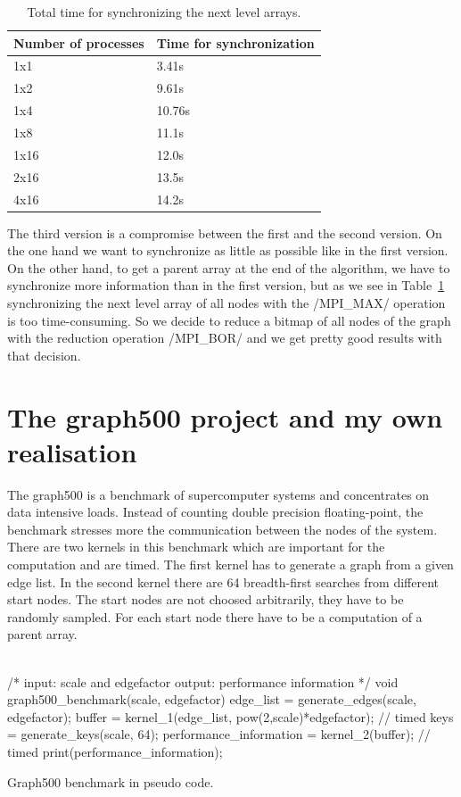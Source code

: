 \documentclass[12pt,a4paper]{article}
\begin{document}
\begin{table}[!ht]
	\centering
	\begin{tabular}{ | l | l |}
  		\hline
  		Number of processes & Time for synchronization \\ \hline
  		1x1 & 3.41s \\ \hline
		1x2 & 9.61s \\ \hline
		1x4 & 10.76s \\ \hline
		1x8 & 11.1s \\ \hline
		1x16 & 12.0s \\ \hline
		2x16 & 13.5s \\ \hline
		4x16 & 14.2s \\ \hline
	\end{tabular}
	\caption{Total time for synchronizing the next level arrays.}
  	\label{tab:reducescatter}
\end{table}
The third version is a compromise between the first and the second version. On the one hand we want to synchronize as little as possible like in the first version. On the other hand, to get a parent array at the end of the algorithm, we have to synchronize more information than in the first version, but as we see in Table~\ref{tab:reducescatter} synchronizing the next level array of all nodes with the \cinline/MPI_MAX/ operation is too time-consuming. So we decide to reduce a bitmap of all nodes of the graph with the reduction operation \cinline/MPI_BOR/ and we get pretty good results with that decision.

\section{The graph500 project and my own realisation}
\label{sec:graph500}

The graph500 \cite{graph500} is a benchmark of supercomputer systems and concentrates on data intensive loads. Instead of counting double precision floating-point, the benchmark stresses more the communication between the nodes of the system. There are two kernels in this benchmark which are important for the computation and are timed. The first kernel has to generate a graph from a given edge list. In the second kernel there are 64 breadth-first searches from different start nodes. The start nodes are not choosed arbitrarily, they have to be randomly sampled. For each start node there have to be a computation of a parent array.\\
\\
\begin{listing}[H]
\begin{ccode}
/*
input: scale and edgefactor
output: performance information
*/
void graph500_benchmark(scale, edgefactor){
	edge_list = generate_edges(scale, edgefactor);
	buffer = kernel_1(edge_list, pow(2,scale)*edgefactor); // timed
	keys = generate_keys(scale, 64);
	performance_information = kernel_2(buffer); // timed
	print(performance_information);
}
\end{ccode}
\caption{Graph500 benchmark in pseudo code.}
\label{lst:graph500}
\end{listing}
\end{document}
